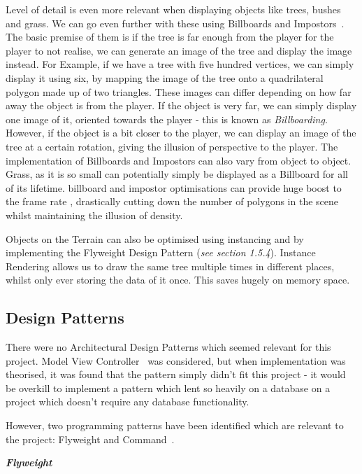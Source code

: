 \documentclass[a4paper,10pt]{report}
\begin{document}
Level of detail is even more relevant when displaying objects like trees, bushes and grass. We can go even further with these using Billboards and Impostors~\cite{jia2013fast}. The basic premise of them is if the tree is far enough from the player for the player to not realise, we can generate an image of the tree and display the image instead. For Example, if we have a tree with five hundred vertices, we can simply display it using six, by mapping the image of the tree onto a quadrilateral polygon made up of two triangles. These images can differ depending on how far away the object is from the player. If the object is very far, we can simply display one image of it, oriented towards the player - this is known as \textit{Billboarding}. However, if the object is a bit closer to the player, we can display an image of the tree at a certain rotation, giving the illusion of perspective to the player. The implementation of Billboards and Impostors can also vary from object to object. Grass, as it is so small can potentially simply be displayed as a Billboard for all of its lifetime. billboard and impostor optimisations can provide huge boost to the frame rate , drastically cutting down the number of polygons in the scene whilst maintaining the illusion of density. \medskip

Objects on the Terrain can also be optimised using instancing and by implementing the Flyweight Design Pattern (\emph{see section 1.5.4}). Instance Rendering allows us to draw the same tree multiple times in different places, whilst only ever storing the data of it once. This saves hugely on memory space.  


\subsection{Design Patterns}

There were no Architectural Design Patterns which seemed relevant for this project. Model View Controller~\cite{vlissides1995design} was considered, but when implementation was theorised, it was found that the pattern simply didn't fit this project - it would be overkill to implement a pattern which lent so heavily on a database on a project which doesn't require any database functionality. \medskip

However, two programming patterns have been identified which are relevant to the project: Flyweight and Command~\cite{nystrom2014game}.\medskip

\emph{\textbf{Flyweight}}\medskip
\end{document}
